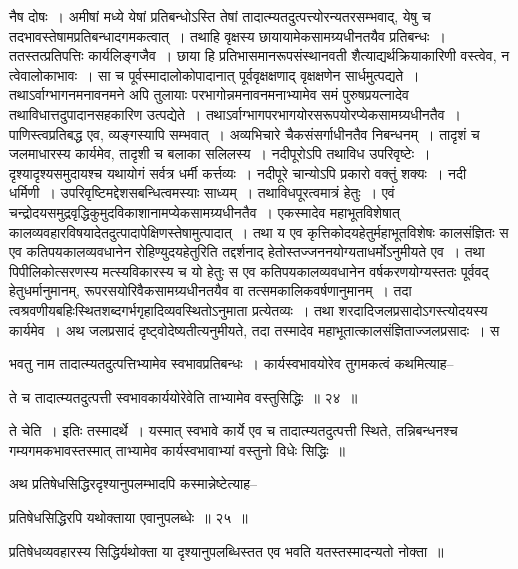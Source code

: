 \documentclass[article,12pt,a4paper]{memoir}
\begin{document}
	  \pstart नैष दोषः । अमीषां मध्ये येषां प्रतिबन्धोऽस्ति तेषां तादात्म्यतदुत्पत्त्योरन्यतरसम्भवाद्, येषु च तदभावस्तेषामप्रतिबन्धादगमकत्वात् । तथाहि वृक्षस्य छायायामेकसामग्र्यधीनतयैव प्रतिबन्धः । ततस्तत्प्रतिपत्तिः कार्यलिङ्गजैव । छाया हि प्रतिभासमानरूपसंस्थानवती शैत्याद्यर्थक्रियाकारिणी वस्त्वेव, न त्वेवालोकाभावः । सा च पूर्वस्मादालोकोपादानात् पूर्ववृक्षक्षणाद् वृक्षक्षणेन सार्धमुत्पद्यते । तथाऽर्वाग्भागनमनावनमने अपि तुलायाः परभागोन्नमनावनमनाभ्यामेव समं पुरुषप्रयत्नादेव तथाविधात्तदुपादानसह\leavevmode{}कारिण उत्पद्येते । तथाऽर्वाग्भागपरभागयोरसरूपयोरप्येकसामग्र्यधीनतैव । पाणिस्त्वप्रतिबद्ध एव, व्यङ्गस्यापि सम्भवात् । अव्यभिचारे चैकसंसर्गाधीनतैव निबन्धनम् । तादृशं च जलमाधारस्य कार्यमेव, तादृशी च बलाका सलिलस्य । नदीपूरोऽपि तथाविध उपरिवृष्टेः । दृश्यादृश्यसमुदायश्च यथायोगं सर्वत्र धर्मी कर्त्तव्यः । नदीपूरे चान्योऽपि प्रकारो वक्तुं शक्यः । नदी धर्मिणी । उपरिवृष्टिमद्देशसबन्धित्वमस्याः साध्यम् । तथाविधपूरत्वमात्रं हेतुः । एवं चन्द्रोदयसमुद्रवृद्धिकुमुदविकाशानामप्येकसामग्र्यधीनतैव । एकस्मादेव महाभूतविशेषात् कालव्यवहारविषयादेतदुत्पादापेक्षिणस्तेषामुत्पादात् । तथा य एव कृत्तिकोदयहेतुर्महाभूतविशेषः कालसंज्ञितः स एव कतिपयकालव्यवधानेन रोहिण्युदयहेतुरिति तद्दर्शनाद् हेतोस्तज्जननयोग्यताधर्मोऽनुमीयते एव । तथा पिपीलिकोत्सरणस्य मत्स्यविकारस्य च यो हेतुः स एव कतिपयकालव्यवधानेन वर्षकरणयोग्यस्ततः पूर्ववद् हेतुधर्मानुमानम्, रूपरसयोरिवैकसामग्र्यधीनतयैव वा तत्समकालिकवर्षणानुमानम् । तदा त्वश्रवणीयबहिःस्थितशब्दगर्भगृहादिव्यवस्थितोऽनुमाता प्रत्येतव्यः । तथा शरदादिजलप्रसादोऽगस्त्योदयस्य कार्यमेव । अथ जलप्रसादं दृष्ट्वोदेष्यतीत्यनुमीयते, तदा तस्मादेव महाभूतात्कालसंज्ञिताज्जलप्रसादः । स \leavevmode{} 
	  
	भवतु नाम तादात्म्यतदुत्पत्तिभ्यामेव स्वभावप्रतिबन्धः । कार्यस्वभावयोरेव तुगमकत्वं कथमित्याह--  
	  
	ते च तादात्म्यतदुत्पत्ती स्वभावकार्ययोरेवेति ताभ्यामेव वस्तुसिद्धिः ॥ २४ ॥ 
	  
	ते चेति । इतिः तस्मादर्थे । यस्मात् स्वभावे कार्ये एव च तादात्म्यतदुत्पत्ती स्थिते, तन्निबन्धनश्च गम्यगमकभावस्तस्मात् ताभ्यामेव कार्यस्वभावाभ्यां वस्तुनो विधेः सिद्धिः ॥  
	  
	अथ प्रतिषेधसिद्धिरदृश्यानुपलम्भादपि कस्मान्नेष्टेत्याह--  
	  
	प्रतिषेधसिद्धिरपि यथोक्ताया एवानुपलब्धेः ॥ २५ ॥ 
	  
	प्रतिषेधव्यवहारस्य सिद्धिर्यथोक्ता या दृश्यानुपलब्धिस्तत एव भवति यतस्तस्मादन्यतो नोक्ता ॥  
	  
\end{document}
